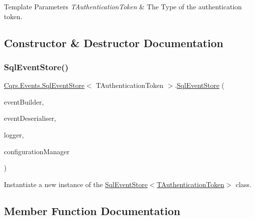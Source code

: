 \begin{DoxyTemplParams}{Template Parameters}
{\em T\+Authentication\+Token} & The Type of the authentication token.\\
\hline
\end{DoxyTemplParams}


\subsection{Constructor \& Destructor Documentation}
\mbox{\label{classCqrs_1_1Events_1_1SqlEventStore_a15df78a1b12d2e3035b9715e9bfc8535_a15df78a1b12d2e3035b9715e9bfc8535}} 
\subsubsection{\texorpdfstring{Sql\+Event\+Store()}{SqlEventStore()}}
{\footnotesize\ttfamily \hyperlink{classCqrs_1_1Events_1_1SqlEventStore}{Cqrs.\+Events.\+Sql\+Event\+Store}$<$ T\+Authentication\+Token $>$.\hyperlink{classCqrs_1_1Events_1_1SqlEventStore}{Sql\+Event\+Store} (\begin{DoxyParamCaption}\item[{\hyperlink{interfaceCqrs_1_1Events_1_1IEventBuilder}{I\+Event\+Builder}$<$ T\+Authentication\+Token $>$}]{event\+Builder,  }\item[{\hyperlink{interfaceCqrs_1_1Events_1_1IEventDeserialiser}{I\+Event\+Deserialiser}$<$ T\+Authentication\+Token $>$}]{event\+Deserialiser,  }\item[{I\+Logger}]{logger,  }\item[{\hyperlink{interfaceCqrs_1_1Configuration_1_1IConfigurationManager}{I\+Configuration\+Manager}}]{configuration\+Manager }\end{DoxyParamCaption})}



Instantiate a new instance of the \hyperlink{classCqrs_1_1Events_1_1SqlEventStore_a15df78a1b12d2e3035b9715e9bfc8535_a15df78a1b12d2e3035b9715e9bfc8535}{Sql\+Event\+Store$<$\+T\+Authentication\+Token$>$} class. 



\subsection{Member Function Documentation}
\mbox{\label{classCqrs_1_1Events_1_1SqlEventStore_a94ce64c00db57e5b9dbd10f74a4cef5b_a94ce64c00db57e5b9dbd10f74a4cef5b}} 
